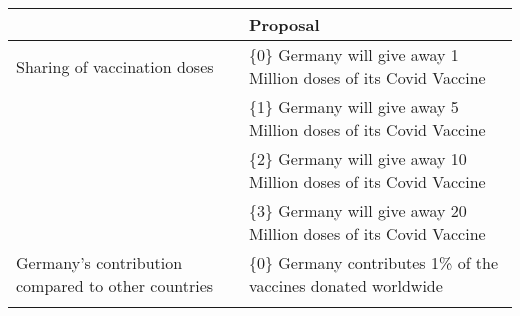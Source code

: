 \documentclass[12pt,oneside,smallheadings,chapterprefix=true]{article}
\begin{document}
\begin{longtable}[]{@{}ll@{}}
\toprule
\begin{minipage}[b]{0.40\columnwidth}\raggedright
\strut
\end{minipage} & \begin{minipage}[b]{0.54\columnwidth}\raggedright
Proposal\strut
\end{minipage}\tabularnewline
\midrule
\endhead
\begin{minipage}[t]{0.40\columnwidth}\raggedright
Sharing of vaccination doses\strut
\end{minipage} & \begin{minipage}[t]{0.54\columnwidth}\raggedright
\{0\} Germany will give away 1 Million doses of its Covid Vaccine\strut
\end{minipage}\tabularnewline
\begin{minipage}[t]{0.40\columnwidth}\raggedright
\strut
\end{minipage} & \begin{minipage}[t]{0.54\columnwidth}\raggedright
\{1\} Germany will give away 5 Million doses of its Covid Vaccine\strut
\end{minipage}\tabularnewline
\begin{minipage}[t]{0.40\columnwidth}\raggedright
\strut
\end{minipage} & \begin{minipage}[t]{0.54\columnwidth}\raggedright
\{2\} Germany will give away 10 Million doses of its Covid Vaccine\strut
\end{minipage}\tabularnewline
\begin{minipage}[t]{0.40\columnwidth}\raggedright
\strut
\end{minipage} & \begin{minipage}[t]{0.54\columnwidth}\raggedright
\{3\} Germany will give away 20 Million doses of its Covid Vaccine\strut
\end{minipage}\tabularnewline
\begin{minipage}[t]{0.40\columnwidth}\raggedright
Germany's contribution compared to other countries\strut
\end{minipage} & \begin{minipage}[t]{0.54\columnwidth}\raggedright
\{0\} Germany contributes 1\% of the vaccines donated worldwide\strut
\end{minipage}\tabularnewline
\begin{minipage}[t]{0.40\columnwidth}\raggedright
\strut
\end{minipage} & \begin{minipage}[t]{0.54\columnwidth}\raggedright

\end{minipage}
\end{longtable}
\end{document}
